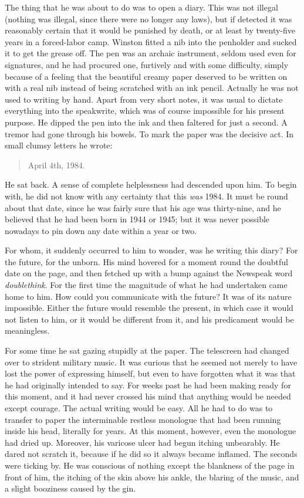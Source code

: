 The thing that he was about to do was to open a diary. This was not
illegal (nothing was illegal, since there were no longer any laws), but
if detected it was reasonably certain that it would be punished by
death, or at least by twenty-five years in a forced-labor camp. Winston
fitted a nib into the penholder and sucked it to get the grease off. The
pen was an archaic instrument, seldom used even for signatures, and he
had procured one, furtively and with some difficulty, simply because of
a feeling that the beautiful creamy paper deserved to be written on with
a real nib instead of being scratched with an ink pencil. Actually he
was not used to writing by hand. Apart from very short notes, it was
usual to dictate everything into the speakwrite, which was of course
impossible for his present purpose. He dipped the pen into the ink and
then faltered for just a second. A tremor had gone through his bowels.
To mark the paper was the decisive act. In small clumsy letters he
wrote:


\begin{quotation}
  April 4th, 1984.
\end{quotation}

He sat back. A sense of complete helplessness had descended upon him. To
begin with, he did not know with any certainty that this \emph{was} 1984. It
must be round about that date, since he was fairly sure that his age was
thirty-nine, and he believed that he had been born in 1944 or 1945; but it
was never possible nowadays to pin down any date within a year or two.

For whom, it suddenly occurred to him to wonder, was he writing this
diary? For the future, for the unborn. His mind hovered for a moment
round the doubtful date on the page, and then fetched up with a bump
against the Newspeak word \emph{doublethink}. For the first time the
magnitude of what he had undertaken came home to him. How could you
communicate with the future? It was of its nature impossible. Either the
future would resemble the present, in which case it would not listen to
him, or it would be different from it, and his predicament would be
meaningless.

For some time he sat gazing stupidly at the paper. The telescreen had
changed over to strident military music. It was curious that he seemed
not merely to have lost the power of expressing himself, but even to
have forgotten what it was that he had originally intended to say. For
weeks past he had been making ready for this moment, and it had never
crossed his mind that anything would be needed except courage. The
actual writing would be easy. All he had to do was to transfer to paper
the interminable restless monologue that had been running inside his
head, literally for years. At this moment, however, even the monologue
had dried up. Moreover, his varicose ulcer had begun itching unbearably.
He dared not scratch it, because if he did so it always became inflamed.
The seconds were ticking by. He was conscious of nothing except the
blankness of the page in front of him, the itching of the skin above his
ankle, the blaring of the music, and a slight booziness caused by the
gin.

